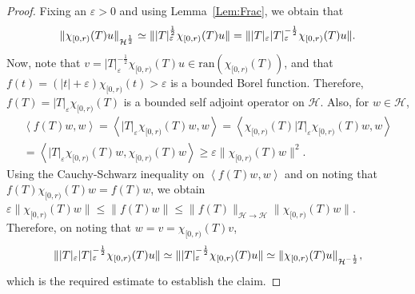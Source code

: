 \documentclass[a4paper,10pt,reqno]{amsart}
\newcommand{\modulus}[1]{|#1|}
\newcommand{\norm}[1]{\| #1 \|}%
\newcommand{\OpSobH}[2][{}]{{\mathcal{H}}^{#2}_{\rm #1}}
\newcommand{\Hil}{\mathscr{H}}
\newcommand{\ran}{\mathrm{ran}}
\newcommand{\inprod}[1]{\left\langle #1 \right\rangle}%
\renewcommand{\epsilon}{\varepsilon}
\theoremstyle{definition}
\begin{document}
\begin{proof}
Fixing an $\epsilon > 0$ and using Lemma~\ref{Lem:Frac}, we obtain that
$$\norm{\chi_{[0,r)}(T)u}_{\OpSobH{\frac{1}{2}}} \simeq \norm{\modulus{T}_\epsilon^\frac{1}{2}\chi_{[0,r)}(T)u}  = \norm{\modulus{T}_\epsilon \modulus{T}_\epsilon^{-\frac{1}{2}}\chi_{[0,r)}(T)u}.$$
Now, note that $v = \modulus{T}_\epsilon^{-\frac{1}{2}}\chi_{[0,r)}(T)u \in \ran(\chi_{[0,r)}(T))$, and that $f(t) =( \modulus{t} + \epsilon)\chi_{[0,r)}(t) > \epsilon$ is a bounded Borel function.
Therefore, $f(T) = \modulus{T}_\epsilon\chi_{[0,r)}(T)$ is a bounded self adjoint operator on $\Hil$.
Also, for $w \in \Hil$,
\begin{multline*}
\inprod{f(T)w,w} = \inprod{\modulus{T}_\epsilon \chi_{[0,r)}(T)w,w} = \inprod{\chi_{[0,r)}(T) \modulus{T}_\epsilon \chi_{[0,r)}(T)w,w} \\
= \inprod{\modulus{T}_\epsilon \chi_{[0,r)}(T)w, \chi_{[0,r)}(T)w} \geq \epsilon  \norm{ \chi_{[0,r)}(T)w}^2.
\end{multline*}
Using the Cauchy-Schwarz inequality on $\inprod{f(T)w,w}$ and on noting that $f(T) \chi_{[0,r)}(T)w = f(T) w$,  we obtain
$\epsilon \norm{\chi_{[0,r)}(T) w} \leq \norm{f(T)w} \leq \norm{f(T)}_{\Hil\to\Hil} \norm{\chi_{[0,r)}(T)w}$.
Therefore, on noting that $w = v = \chi_{[0,r)}(T)v$,
$$\norm{\modulus{T}_\epsilon \modulus{T}_\epsilon^{-\frac{1}{2}}\chi_{[0,r)}(T)u} \simeq \norm{ \modulus{T}_\epsilon^{-\frac{1}{2}}\chi_{[0,r)}(T)u} \simeq \norm{\chi_{[0,r)}(T)u}_{\OpSobH{-\frac{1}{2}}},$$
which is the required estimate to establish the claim.
\end{proof}
\end{document}
